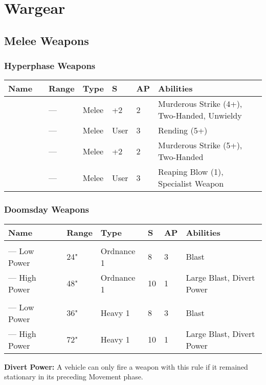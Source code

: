 \section{Wargear}

\subsection{Melee Weapons} \label{Melee Weapons}

\subsubsection{Hyperphase Weapons} 

\label{Hyperphase Sword} \label{Hyperphase Thresher} \label{Hyperphase Reap-Blade} \label{Hyperphase Harvester}
\noindent
\begin{tabular}{||m{110pt} m{30pt} m{31pt} m{55pt} m{12pt} m{12pt} m{210pt}||}
	\hline
	Name & & Range & Type & S & AP & Abilities \\
	\hline
	\quickref{Hyperphase Harvester} &  & — & Melee & +2 & 2 & Murderous Strike (4+), Two-Handed, Unwieldy \\
	\quickref{Hyperphase Sword} &  & — & Melee & User & 3 & Rending (5+) \\
	\quickref{Hyperphase Reap-Blade} &  & — & Melee & +2 & 2 & Murderous Strike (5+), Two-Handed \\
	\quickref{Hyperphase Thresher} &  & — & Melee & User & 3 & Reaping Blow (1), Specialist Weapon \\
	\hline
\end{tabular}

\subsubsection{Doomsday Weapons} 
\label{Doomsday Cannon} \label{Doomsday Blaster}
\noindent
\begin{tabular}{||m{110pt} m{30pt} m{31pt} m{55pt} m{12pt} m{12pt} m{210pt}||}
	\hline
	Name & & Range & Type & S & AP & Abilities \\
	\hline
	\quickref{Doomsday Blaster} & & & & & & \\
	— Low Power &  & 24" & Ordnance 1 & 8 & 3 & Blast \\
	— High Power & & 48" & Ordnance 1 & 10 & 1 & Large Blast, Divert Power \\
	\quickref{Doomsday Cannon} & & & & & & \\
	— Low Power &  & 36" & Heavy 1 & 8 & 3 & Blast \\
	— High Power & & 72" & Heavy 1 & 10 & 1 & Large Blast, Divert Power \\
\end{tabular}
\textbf{Divert Power:} A vehicle can only fire a weapon with this rule if it remained stationary in its preceding Movement phase. 


